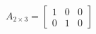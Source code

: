 \documentclass[preview]{standalone}
\begin{document}
\begin{align*}
A_{2 \times 3} = \begin{bmatrix} 1 & 0 & 0 \\ 0 & 1 & 0 \end{bmatrix}
\end{align*}
\end{document}
